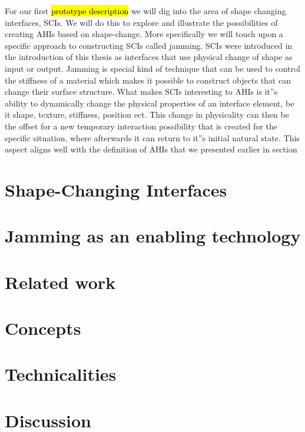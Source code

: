 For our first \hl{prototype description} we will dig into the area of shape changing interfaces, SCIs.
We will do this to explore and illustrate the possibilities of creating AHIs based on shape-change.
More specifically we will touch upon a specific approach to constructing SCIs called jamming.
SCIs were introduced in the introduction of this thesis as interfaces that use physical change of shape as input or output.
Jamming is special kind of technique that can be used to control the stiffness of a material which makes it possible to construct objects that can change their surface structure.
What makes SCIs interesting to AHIs is it''s ability to dynamically change the physical properties of an interface element, be it shape, texture, stiffness, position ect.
This change in physicality can then be the offset for a new temporary interaction possibility that is created for the specific situation, where afterwards it can return to it''s initial natural state.
This aspect aligns well with the definition of AHIs that we presented earlier in section  


\section{Shape-Changing Interfaces}
\label{ch:jamming:shape-change} 


\section{Jamming as an enabling technology}
\label{ch:jamming:enabling-technology} 


\section{Related work}
\label{ch:jamming:related-work} 


\section{Concepts}
\label{ch:jamming:concepts} 


\section{Technicalities}
\section{Discussion}
